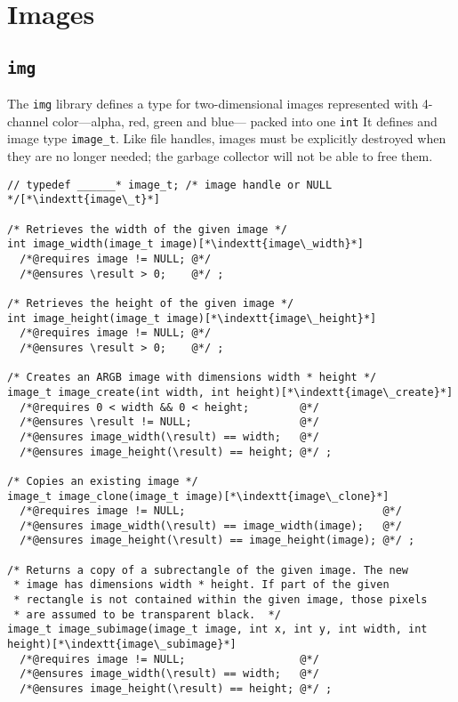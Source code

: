 \documentclass[11pt]{article}
\makeatletter
\newcommand{\indextt}[1]{\index{#1@\texttt{#1}}}
\makeatother
\begin{document}
\section{Images}

\subsection{\tt img}

The \lstinline'img' library defines a type for two-dimensional images
represented with 4-channel color---alpha, red, green and blue---
packed into one \lstinline'int'  It defines and image type \lstinline'image_t'.
Like file handles, images must be explicitly destroyed when they
are no longer needed; the garbage collector will not be able to
free them.

\begin{lstlisting}
// typedef ______* image_t; /* image handle or NULL */[*\indextt{image\_t}*]

/* Retrieves the width of the given image */
int image_width(image_t image)[*\indextt{image\_width}*]
  /*@requires image != NULL; @*/
  /*@ensures \result > 0;    @*/ ;

/* Retrieves the height of the given image */
int image_height(image_t image)[*\indextt{image\_height}*]
  /*@requires image != NULL; @*/
  /*@ensures \result > 0;    @*/ ;

/* Creates an ARGB image with dimensions width * height */
image_t image_create(int width, int height)[*\indextt{image\_create}*]
  /*@requires 0 < width && 0 < height;        @*/
  /*@ensures \result != NULL;                 @*/
  /*@ensures image_width(\result) == width;   @*/
  /*@ensures image_height(\result) == height; @*/ ;

/* Copies an existing image */
image_t image_clone(image_t image)[*\indextt{image\_clone}*]
  /*@requires image != NULL;                               @*/
  /*@ensures image_width(\result) == image_width(image);   @*/
  /*@ensures image_height(\result) == image_height(image); @*/ ;

/* Returns a copy of a subrectangle of the given image. The new
 * image has dimensions width * height. If part of the given
 * rectangle is not contained within the given image, those pixels
 * are assumed to be transparent black.  */
image_t image_subimage(image_t image, int x, int y, int width, int height)[*\indextt{image\_subimage}*]
  /*@requires image != NULL;                  @*/
  /*@ensures image_width(\result) == width;   @*/
  /*@ensures image_height(\result) == height; @*/ ;


\end{lstlisting}
\end{document}

